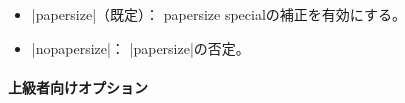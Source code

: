 \documentclass[uplatex,dvipdfmx,a4paper]{jsarticle}
\newcommand{\Note}{\par\noindent ※}
\newcommand{\Means}{：\quad}
\newcommand{\／}{\mbox{}／\mbox{}}
\begin{document}
\begin{itemize}
  \Note ドライバが|dvips|の場合は既定で|convbkmk|が有効になる。
  これにより元の既定値|tounicode|は実質的に
  \footnote{|tounicode|の説明中の項目1の機能はdvipsでは効果がなく、
    また項目2の機能は上書きされるため。}%
  無効化される。
\item |papersize|（既定）\Means
  papersize specialの補正を有効にする。
\item |nopapersize|\Means
  |papersize|の否定。
\end{itemize}

\paragraph{上級者向けオプション}\mbox{}
\end{document}
